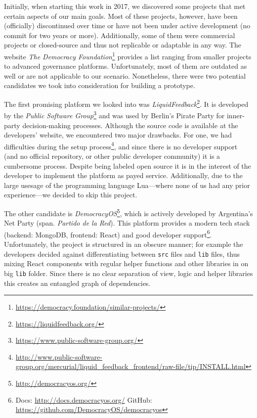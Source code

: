 Initially, when starting this work in 2017, we discovered some projects that met certain aspects of our main goals. Most of these projects, however, have been (officially) discontinued over time or have not been under active development (no commit for two years or more). Additionally, some of them were commercial projects or closed-source and thus not replicable or adaptable in any way. The website \textit{The Democracy Foundation}\footnote{\url{https://democracy.foundation/similar-projects/}} provides a list ranging from smaller projects to advanced governance platforms. Unfortunately, most of them are outdated as well or are not applicable to our scenario. Nonetheless, there were two potential candidates we took into consideration for building a prototype.

The first promising platform we looked into was \textit{LiquidFeedback}\footnote{\url{https://liquidfeedback.org/}}. It is developed by the \textit{Public Software Group}\footnote{\url{https://www.public-software-group.org/}} and was used by Berlin’s Pirate Party for inner-party decision-making processes. Although the source code is available at the developers’ website, we encountered two major drawbacks. For one, we had difficulties during the setup process\footnote{\url{http://www.public-software-group.org/mercurial/liquid_feedback_frontend/raw-file/tip/INSTALL.html}}, and since there is no developer support (and no official repository, or other public developer community) it is a cumbersome process. Despite being labeled open source it is in the interest of the developer to implement the platform as payed service. Additionally, due to the large usesage of the programming language Lua---where none of us had any prior experience---we decided to skip this project.

The other candidate is \textit{DemocracyOS}\footnote{\url{http://democracyos.org/}}, which is actively developed by Argentina’s Net Party (span. \textit{Partido de la Red}). This platform provides a modern tech stack (backend: MongoDB, frontend: React) and good developer support\footnote{Docs: \url{http://docs.democracyos.org/} GitHub: \url{https://github.com/DemocracyOS/democracyos}}. Unfortunately, the project is structured in an obscure manner; for example the developers decided against differentiating between \texttt{src} files and \texttt{lib} files, thus mixing React components with regular helper functions and other libraries in on big \texttt{lib} folder. Since there is no clear separation of view, logic and helper libraries this creates an entangled graph of dependencies.

